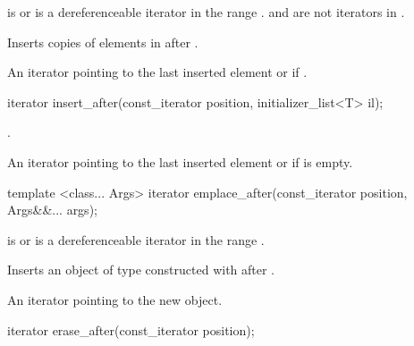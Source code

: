 \begin{itemdescr}
\pnum
\requires {} is  or is a dereferenceable
iterator in the range .
 and  are not iterators in .

\pnum
\effects Inserts copies of elements in  after .

\pnum
\returns
An iterator pointing to the last inserted element or  if .
\end{itemdescr}

%
%
\begin{itemdecl}
iterator insert_after(const_iterator position, initializer_list<T> il);
\end{itemdecl}

\begin{itemdescr}
\pnum
\effects {}.

\pnum
\returns
An iterator pointing to the last inserted element or  if  is empty.
\end{itemdescr}


%
%
\begin{itemdecl}
template <class... Args>
  iterator emplace_after(const_iterator position, Args&&... args);
\end{itemdecl}

\begin{itemdescr}
\pnum
\requires {} is  or is a dereferenceable
iterator in the range .

\pnum
\effects Inserts an object of type  constructed with
 after .

\pnum
\returns An iterator pointing to the new object.
\end{itemdescr}

%
%
\begin{itemdecl}
iterator erase_after(const_iterator position);
\end{itemdecl}

